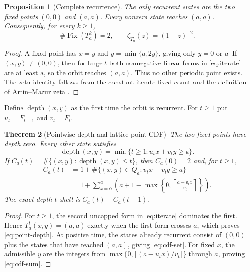 \documentclass[11pt,a4paper]{amsart}
\newcommand{\Fix}{\operatorname{Fix}}
\newcommand{\depth}{\operatorname{depth}}
\newtheorem{theorem}{Theorem}[section]
\newtheorem{proposition}[theorem]{Proposition}
\begin{document}
\begin{proposition}[Complete recurrence]
\label{prop:recurrence}
The only recurrent states are the two fixed points $(0,0)$ and $(a,a)$.
Every nonzero state reaches $(a,a)$.
Consequently, for every $k\geq1$,
\begin{equation}
 \label{eq:fixed}
 \#\Fix(T_a^k)=2,
 \qquad \zeta_{T_a}(z)=(1-z)^{-2}.
\end{equation}
\end{proposition}

\begin{proof}
A fixed point has $x=y$ and $y=\min\{a,2y\}$, giving only $y=0$ or $a$.
If $(x,y)\neq(0,0)$, then for large $t$ both nonnegative linear forms in
\eqref{eq:iterate} are at least $a$, so the orbit reaches $(a,a)$.  Thus no
other periodic point exists.  The zeta identity follows from the constant
iterate-fixed count and the definition of Artin--Mazur zeta
\citep{ArtinMazur1965}.
\end{proof}

Define $\depth(x,y)$ as the first time the orbit is recurrent.  For $t\geq1$
put $u_t=F_{t-1}$ and $v_t=F_t$.

\begin{theorem}[Pointwise depth and lattice-point CDF]
\label{thm:cdf}
The two fixed points have depth zero.  Every other state satisfies
\begin{equation}
 \label{eq:point-depth}
 \depth(x,y)=\min\{t\geq1:u_tx+v_ty\geq a\}.
\end{equation}
If $C_a(t)=\#\{(x,y):\depth(x,y)\leq t\}$, then $C_a(0)=2$ and, for
$t\geq1$,
\begin{align}
 C_a(t)
 &=1+\#\{(x,y)\in Q_a:u_tx+v_ty\geq a\}                    \label{eq:cdf-set}\\
 &=1+\sum_{x=0}^{a}
 \left(a+1-\max\left\{0,
 \left\lceil\frac{a-u_tx}{v_t}\right\rceil\right\}\right).
 \label{eq:cdf-sum}
\end{align}
The exact depth-$t$ shell is $C_a(t)-C_a(t-1)$.
\end{theorem}

\begin{proof}
For $t\geq1$, the second uncapped form in \eqref{eq:iterate} dominates the
first.  Hence $T_a^t(x,y)=(a,a)$ exactly when the first form crosses $a$,
which proves \eqref{eq:point-depth}.  At positive time, the states already
recurrent consist of $(0,0)$ plus the states that have reached $(a,a)$,
giving \eqref{eq:cdf-set}.  For fixed $x$, the admissible $y$ are the
integers from
$\max\{0,\lceil(a-u_tx)/v_t\rceil\}$ through $a$, proving
\eqref{eq:cdf-sum}.
\end{proof}
\end{document}
